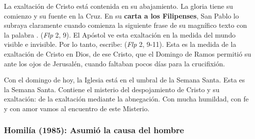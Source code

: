 \begin{body}
La exaltación de Cristo está contenida en su abajamiento. La gloria tiene su comienzo y su fuente en la Cruz. En su \textbf{carta a los Filipenses}, San Pablo lo subraya claramente cuando comienza la siguiente frase de su magnífico texto con la palabra .  (\textit{Flp} 2, 9). El Apóstol ve esta exaltación en la medida del mundo visible e invisible. Por lo tanto, escribe:  (\textit{Flp} 2, 9-11). Esta es la medida de la exaltación de Cristo en Dios, de ese Cristo, que el Domingo de Ramos permitió su  ante los ojos de Jerusalén, cuando faltaban pocos días para la crucifixión.

Con el domingo de hoy, la Iglesia está en el umbral de la Semana Santa. Esta es la Semana Santa. Contiene el misterio del despojamiento de Cristo y su exaltación: de la exaltación mediante la abnegación. Con mucha humildad, con fe y con amor vamos al encuentro de este Misterio.
\end{body}

\label{b2-04-01-1982H}
\newpage

\subsubsection{Homilía (1985): Asumió la causa del hombre}


